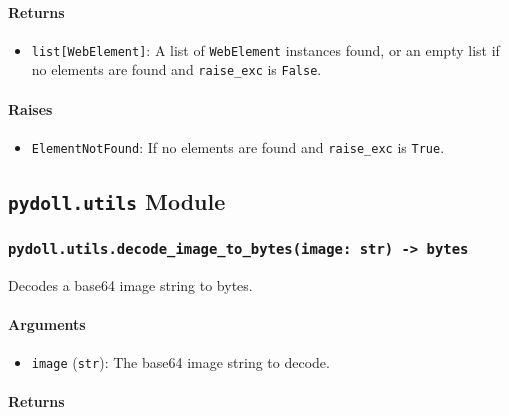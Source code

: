 \documentclass{article}
\begin{document}
\paragraph{Returns}

\begin{itemize}
    \item \lstinline[style=pythonstyle]|list[WebElement]|: A list of \lstinline[style=pythonstyle]|WebElement| instances found, or an empty list if no elements are found and \lstinline[style=pythonstyle]|raise_exc| is \lstinline[style=pythonstyle]|False|.
\end{itemize}

\paragraph{Raises}

\begin{itemize}
    \item \lstinline[style=pythonstyle]|ElementNotFound|: If no elements are found and \lstinline[style=pythonstyle]|raise_exc| is \lstinline[style=pythonstyle]|True|.
\end{itemize}

\hrulefill

\subsection*{\texttt{pydoll.utils} Module}

\subsubsection*{\texttt{pydoll.utils.decode\_image\_to\_bytes(image: str) -> bytes}}
\noindent Decodes a base64 image string to bytes.

\paragraph{Arguments}

\begin{itemize}
    \item \lstinline[style=pythonstyle]|image| (\lstinline[style=pythonstyle]|str|): The base64 image string to decode.
\end{itemize}

\paragraph{Returns}
\end{document}
